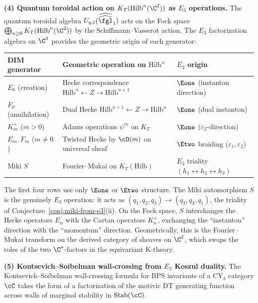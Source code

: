 \medskip
\noindent\textbf{(4) Quantum toroidal action on $K_T(\mathrm{Hilb}^n(\C^2))$ as $E_3$ operations.}
The quantum toroidal algebra $U_{q,t}(\widehat{\widehat{\fgl}}_1)$ acts on the Fock space $\bigoplus_{n \geq 0} K_T(\mathrm{Hilb}^n(\C^2))$ by the Schiffmann--Vasserot action. The $E_3$ factorization algebra on $\C^3$ provides the geometric origin of each generator:

\begin{center}
\renewcommand{\arraystretch}{1.3}
\small
\begin{tabular}{lll}
 \toprule
 DIM generator & Geometric operation on $\mathrm{Hilb}^n$ & $E_3$ origin \\
 \midrule
 $E_0$ (creation) & Hecke correspondence $\mathrm{Hilb}^n \leftarrow Z \to \mathrm{Hilb}^{n+1}$ & $\Eone$ (instanton direction) \\
 $F_0$ (annihilation) & Dual Hecke $\mathrm{Hilb}^{n+1} \leftarrow Z \to \mathrm{Hilb}^n$ & $\Eone$ (dual instanton) \\
 $K_m^+$ ($m > 0$) & Adams operations $\psi^m$ on $K_T$ & $\Eone$ ($\varepsilon_2$-direction) \\
 $E_m, F_m$ ($m \neq 0$) & Twisted Hecke by $\cO(m)$ on universal sheaf & $\Etwo$ braiding ($\varepsilon_1, \varepsilon_2$) \\
 Miki $S$ & Fourier--Mukai on $K_T(\mathrm{Hilb})$ & $E_3$ triality $(h_1 \leftrightarrow h_2 \leftrightarrow h_3)$ \\
 \bottomrule
\end{tabular}
\end{center}

\noindent The first four rows use only $\Eone$ or $\Etwo$ structure. The Miki automorphism $S$ is the genuinely $E_3$ operation: it acts as $(q_1, q_2, q_3) \to (q_2, q_3, q_1)$, the triality of Conjecture~\ref{conj:miki-from-e3}(ii). On the Fock space, $S$ interchanges the Hecke operators $E_n$ with the Cartan operators $K_n^+$, exchanging the ``instanton'' direction with the ``momentum'' direction. Geometrically, this is the Fourier--Mukai transform on the derived category of sheaves on $\C^2$, which swaps the roles of the two $\C^*$-factors in the equivariant K-theory.

\medskip
\noindent\textbf{(5) Kontsevich--Soibelman wall-crossing from $E_3$ Koszul duality.}
The Kontsevich--Soibelman wall-crossing formula for BPS invariants of a CY$_3$ category $\cC$ takes the form of a factorization of the motivic DT generating function across walls of marginal stability in $\mathrm{Stab}(\cC)$.

